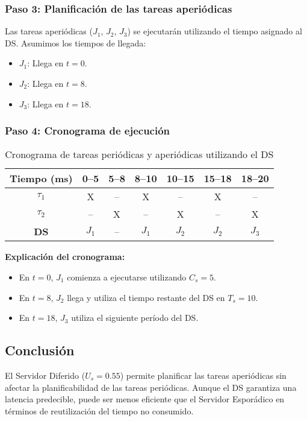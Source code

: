 \documentclass[a4paper,12pt]{article}
\begin{document}
\subsubsection{Paso 3: Planificación de las tareas aperiódicas}
Las tareas aperiódicas (\(J_1\), \(J_2\), \(J_3\)) se ejecutarán utilizando el tiempo asignado al DS. Asumimos los tiempos de llegada:
\begin{itemize}
    \item \(J_1\): Llega en \(t = 0\).
    \item \(J_2\): Llega en \(t = 8\).
    \item \(J_3\): Llega en \(t = 18\).
\end{itemize}

\subsubsection{Paso 4: Cronograma de ejecución}
\begin{table}[H]
\centering
\begin{tabular}{|c|c|c|c|c|c|c|}
\hline
\textbf{Tiempo (ms)} & 0--5 & 5--8 & 8--10 & 10--15 & 15--18 & 18--20 \\ \hline
\textbf{\(\tau_1\)} & X & -- & X & -- & X & -- \\ \hline
\textbf{\(\tau_2\)} & -- & X & -- & X & -- & X \\ \hline
\textbf{DS} & \(J_1\) & -- & \(J_1\) & \(J_2\) & \(J_2\) & \(J_3\) \\ \hline
\end{tabular}
\caption{Cronograma de tareas periódicas y aperiódicas utilizando el DS}
\end{table}

\textbf{Explicación del cronograma:}
\begin{itemize}
    \item En \(t = 0\), \(J_1\) comienza a ejecutarse utilizando \(C_s = 5\).
    \item En \(t = 8\), \(J_2\) llega y utiliza el tiempo restante del DS en \(T_s = 10\).
    \item En \(t = 18\), \(J_3\) utiliza el siguiente período del DS.
\end{itemize}

\subsection{Conclusión}
El Servidor Diferido (\(U_s = 0.55\)) permite planificar las tareas aperiódicas sin afectar la planificabilidad de las tareas periódicas. Aunque el DS garantiza una latencia predecible, puede ser menos eficiente que el Servidor Esporádico en términos de reutilización del tiempo no consumido.
\end{document}
